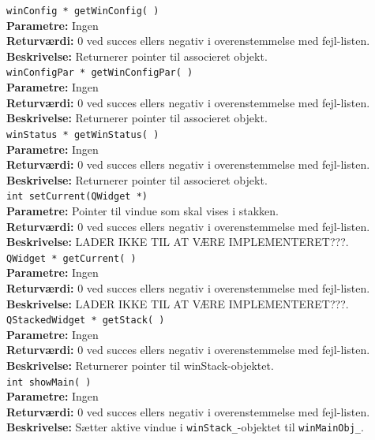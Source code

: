 \verb+winConfig * getWinConfig( )+\\
\textbf{Parametre:} Ingen \\
\textbf{Returværdi:} 0 ved succes ellers negativ i overenstemmelse med fejl-listen. \\
\textbf{Beskrivelse:} Returnerer pointer til associeret objekt.\\

\verb+winConfigPar * getWinConfigPar( )+\\
\textbf{Parametre:} Ingen \\
\textbf{Returværdi:} 0 ved succes ellers negativ i overenstemmelse med fejl-listen. \\
\textbf{Beskrivelse:} Returnerer pointer til associeret objekt.\\

\verb+winStatus * getWinStatus( )+\\
\textbf{Parametre:} Ingen \\
\textbf{Returværdi:} 0 ved succes ellers negativ i overenstemmelse med fejl-listen. \\
\textbf{Beskrivelse:} Returnerer pointer til associeret objekt.\\

\verb+int setCurrent(QWidget *)+\\
\textbf{Parametre:} Pointer til vindue som skal vises i stakken. \\
\textbf{Returværdi:} 0 ved succes ellers negativ i overenstemmelse med fejl-listen. \\
\textbf{Beskrivelse:} LADER IKKE TIL AT VÆRE IMPLEMENTERET???.\\

\verb+QWidget * getCurrent( )+\\
\textbf{Parametre:} Ingen \\
\textbf{Returværdi:} 0 ved succes ellers negativ i overenstemmelse med fejl-listen. \\
\textbf{Beskrivelse:} LADER IKKE TIL AT VÆRE IMPLEMENTERET???.\\

\verb+QStackedWidget * getStack( )+\\
\textbf{Parametre:} Ingen \\
\textbf{Returværdi:} 0 ved succes ellers negativ i overenstemmelse med fejl-listen. \\
\textbf{Beskrivelse:} Returnerer pointer til winStack-objektet.\\

\verb+int showMain( )+\\
\textbf{Parametre:} Ingen \\
\textbf{Returværdi:} 0 ved succes ellers negativ i overenstemmelse med fejl-listen. \\
\textbf{Beskrivelse:} Sætter aktive vindue i \verb+winStack_+-objektet til \verb+winMainObj_+.\\

